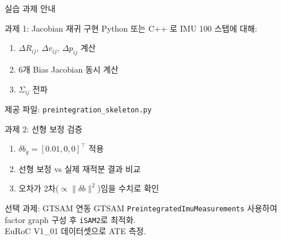 \begin{frame}{실습 과제 안내}

  \begin{block}{과제 1: Jacobian 재귀 구현}
    Python 또는 C++ 로 IMU 100 스텝에 대해:
    \begin{enumerate}
      \item $\Delta R_{ij}$, $\Delta v_{ij}$, $\Delta p_{ij}$ 계산
      \item 6개 Bias Jacobian 동시 계산
      \item $\Sigma_{ij}$ 전파
    \end{enumerate}
    제공 파일: \texttt{preintegration\_skeleton.py}
  \end{block}

  \pause
  \begin{block}{과제 2: 선형 보정 검증}
    \begin{enumerate}
      \item $\delta b_g = [0.01, 0, 0]^\top$\; 적용
      \item 선형 보정 vs 실제 재적분 결과 비교
      \item 오차가 2차($\propto \|\delta b\|^2$)임을 수치로 확인
    \end{enumerate}
  \end{block}

  \pause
  \begin{exampleblock}{선택 과제: GTSAM 연동}
    GTSAM \texttt{PreintegratedImuMeasurements} 사용하여\\
    factor graph 구성 후 \texttt{iSAM2}로 최적화.\\
    EuRoC V1\_01 데이터셋으로 ATE 측정.
  \end{exampleblock}
\end{frame}


